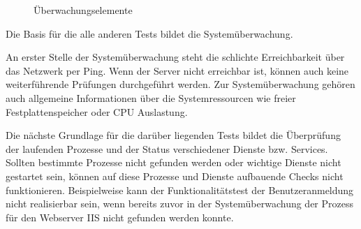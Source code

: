 \begin{figure}[ht]
	\centering
		\caption{Überwachungselemente}
		\label{moniele}
\end{figure}


Die Basis für die alle anderen Tests bildet die Systemüberwachung.

An erster Stelle der Systemüberwachung steht die schlichte Erreichbarkeit über das Netzwerk per Ping.
Wenn der Server nicht erreichbar ist, können auch keine weiterführende Prüfungen durchgeführt werden.
Zur Systemüberwachung gehören auch allgemeine Informationen über die Systemressourcen wie freier Festplattenspeicher oder CPU Auslastung.

Die nächste Grundlage für die darüber liegenden Tests bildet die Überprüfung der laufenden Prozesse und der Status verschiedener Dienste bzw. Services.
Sollten bestimmte Prozesse nicht gefunden werden oder wichtige Dienste nicht gestartet sein, können auf diese Prozesse und Dienste aufbauende Checks nicht funktionieren.
Beispielweise kann der Funktionalitätstest der Benutzeranmeldung nicht realisierbar sein, wenn bereits zuvor in der Systemüberwachung der Prozess für den Webserver \gls{IIS} nicht gefunden werden konnte.